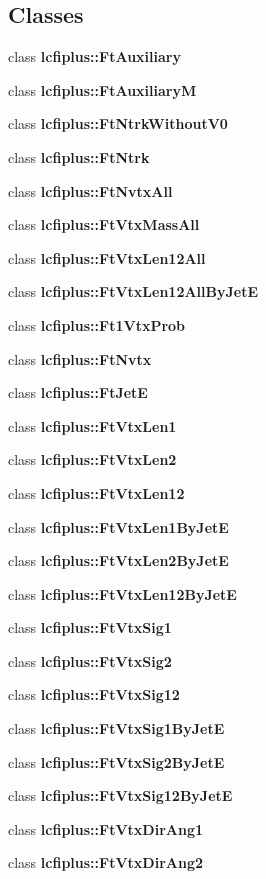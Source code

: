\subsection*{Classes}
\begin{DoxyCompactItemize}
\item 
class \textbf{ lcfiplus\+::\+Ft\+Auxiliary}
\item 
class \textbf{ lcfiplus\+::\+Ft\+AuxiliaryM}
\item 
class \textbf{ lcfiplus\+::\+Ft\+Ntrk\+Without\+V0}
\item 
class \textbf{ lcfiplus\+::\+Ft\+Ntrk}
\item 
class \textbf{ lcfiplus\+::\+Ft\+Nvtx\+All}
\item 
class \textbf{ lcfiplus\+::\+Ft\+Vtx\+Mass\+All}
\item 
class \textbf{ lcfiplus\+::\+Ft\+Vtx\+Len12\+All}
\item 
class \textbf{ lcfiplus\+::\+Ft\+Vtx\+Len12\+All\+By\+JetE}
\item 
class \textbf{ lcfiplus\+::\+Ft1\+Vtx\+Prob}
\item 
class \textbf{ lcfiplus\+::\+Ft\+Nvtx}
\item 
class \textbf{ lcfiplus\+::\+Ft\+JetE}
\item 
class \textbf{ lcfiplus\+::\+Ft\+Vtx\+Len1}
\item 
class \textbf{ lcfiplus\+::\+Ft\+Vtx\+Len2}
\item 
class \textbf{ lcfiplus\+::\+Ft\+Vtx\+Len12}
\item 
class \textbf{ lcfiplus\+::\+Ft\+Vtx\+Len1\+By\+JetE}
\item 
class \textbf{ lcfiplus\+::\+Ft\+Vtx\+Len2\+By\+JetE}
\item 
class \textbf{ lcfiplus\+::\+Ft\+Vtx\+Len12\+By\+JetE}
\item 
class \textbf{ lcfiplus\+::\+Ft\+Vtx\+Sig1}
\item 
class \textbf{ lcfiplus\+::\+Ft\+Vtx\+Sig2}
\item 
class \textbf{ lcfiplus\+::\+Ft\+Vtx\+Sig12}
\item 
class \textbf{ lcfiplus\+::\+Ft\+Vtx\+Sig1\+By\+JetE}
\item 
class \textbf{ lcfiplus\+::\+Ft\+Vtx\+Sig2\+By\+JetE}
\item 
class \textbf{ lcfiplus\+::\+Ft\+Vtx\+Sig12\+By\+JetE}
\item 
class \textbf{ lcfiplus\+::\+Ft\+Vtx\+Dir\+Ang1}
\item 
class \textbf{ lcfiplus\+::\+Ft\+Vtx\+Dir\+Ang2}

\end{DoxyCompactItemize}
